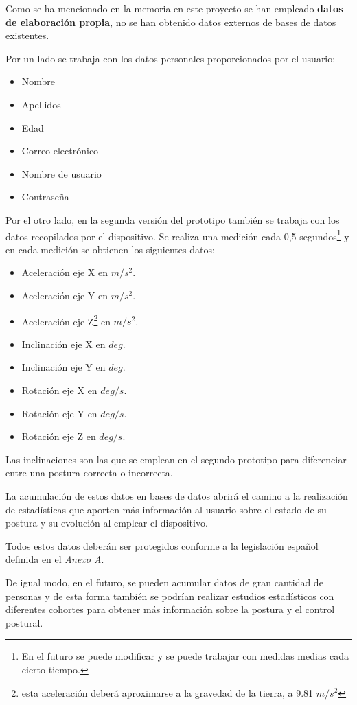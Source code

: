 
Como se ha mencionado en la memoria en este proyecto se han empleado \textbf{datos de elaboración propia}, no se han obtenido datos externos de bases de datos existentes. 

Por un lado se trabaja con los datos personales proporcionados por el usuario:
\begin{itemize}
    \item Nombre
    \item Apellidos
    \item Edad
    \item Correo electrónico
    \item Nombre de usuario
    \item Contraseña
\end{itemize}

Por el otro lado, en la segunda versión del prototipo también se trabaja con los datos recopilados por el dispositivo. Se realiza una medición cada 0,5 segundos\footnote{En el futuro se puede modificar y se puede trabajar con medidas medias cada cierto tiempo.} y en cada medición se obtienen los siguientes datos:
\begin{itemize}
    \item Aceleración eje X en $m/s^{2}$.
    \item Aceleración eje Y en $m/s^{2}$.
    \item Aceleración eje Z\footnote{esta aceleración deberá aproximarse a la gravedad de la tierra, a 9.81 $m/s^{2}$} en $m/s^{2}$.
    \item Inclinación eje X en $deg$.
    \item Inclinación eje Y en $deg$.
    \item Rotación eje X en $deg/s$.
    \item Rotación eje Y en $deg/s$.
    \item Rotación eje Z en $deg/s$.
\end{itemize}

Las inclinaciones son las que se emplean en el segundo prototipo para diferenciar entre una postura correcta o incorrecta.

La acumulación de estos datos en bases de datos abrirá el camino a la realización de estadísticas que aporten más información al usuario sobre el estado de su postura y su evolución al emplear el dispositivo.

Todos estos datos deberán ser protegidos conforme a la legislación español definida en el \textit{Anexo A}.

De igual modo, en el futuro, se pueden acumular datos de gran cantidad de personas y de esta forma también se podrían realizar estudios estadísticos con diferentes cohortes para obtener más información sobre la postura y el control postural.
